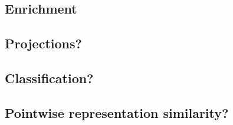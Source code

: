 \documentclass[12pt, letterpaper, twocolumn]{article}
\begin{document}
\subsection{Enrichment}
\subsection{Projections?}
\subsection{Classification?}
\subsection{Pointwise representation similarity?}

\onecolumn
\newpage
\FloatBarrier


\end{document}
